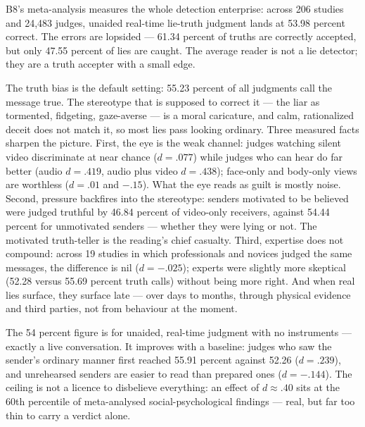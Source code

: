 \begin{core}
B8's meta-analysis measures the whole detection enterprise: across 206 studies and 24,483 judges, unaided real-time lie-truth judgment lands at 53.98 percent correct. The errors are lopsided --- 61.34 percent of truths are correctly accepted, but only 47.55 percent of lies are caught. The average reader is not a lie detector; they are a truth accepter with a small edge.
\end{core}
\begin{mechanism}
The truth bias is the default setting: 55.23 percent of all judgments call the message true. The stereotype that is supposed to correct it --- the liar as tormented, fidgeting, gaze-averse --- is a moral caricature, and calm, rationalized deceit does not match it, so most lies pass looking ordinary. Three measured facts sharpen the picture. First, the eye is the weak channel: judges watching silent video discriminate at near chance ($d = .077$) while judges who can hear do far better (audio $d = .419$, audio plus video $d = .438$); face-only and body-only views are worthless ($d = .01$ and $-.15$). What the eye reads as guilt is mostly noise. Second, pressure backfires into the stereotype: senders motivated to be believed were judged truthful by 46.84 percent of video-only receivers, against 54.44 percent for unmotivated senders --- whether they were lying or not. The motivated truth-teller is the reading's chief casualty. Third, expertise does not compound: across 19 studies in which professionals and novices judged the same messages, the difference is nil ($d = -.025$); experts were slightly more skeptical (52.28 versus 55.69 percent truth calls) without being more right. And when real lies surface, they surface late --- over days to months, through physical evidence and third parties, not from behaviour at the moment.
\end{mechanism}
\begin{conditions}
The 54 percent figure is for unaided, real-time judgment with no instruments --- exactly a live conversation. It improves with a baseline: judges who saw the sender's ordinary manner first reached 55.91 percent against 52.26 ($d = .239$), and unrehearsed senders are easier to read than prepared ones ($d = -.144$). The ceiling is not a licence to disbelieve everything: an effect of $d \approx .40$ sits at the 60th percentile of meta-analysed social-psychological findings --- real, but far too thin to carry a verdict alone.
\end{conditions}
